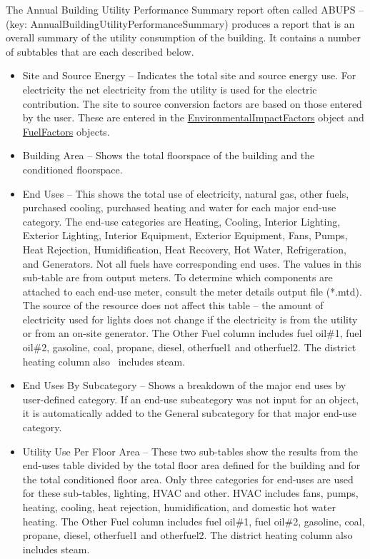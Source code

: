 The Annual Building Utility Performance Summary report often called ABUPS -- (key: AnnualBuildingUtilityPerformanceSummary) produces a report that is an overall summary of the utility consumption of the building. It contains a number of subtables that are each described below.

\begin{itemize}
\item
  Site and Source Energy -- Indicates the total site and source energy use. For electricity the net electricity from the utility is used for the electric contribution. The site to source conversion factors are based on those entered by the user. These are entered in the \hyperref[environmentalimpactfactors]{EnvironmentalImpactFactors} object and \hyperref[fuelfactors]{FuelFactors} objects.
\item
  Building Area -- Shows the total floorspace of the building and the conditioned floorspace.
\item
  End Uses -- This shows the total use of electricity, natural gas, other fuels, purchased cooling, purchased heating and water for each major end-use category. The end-use categories are Heating, Cooling, Interior Lighting, Exterior Lighting, Interior Equipment, Exterior Equipment, Fans, Pumps, Heat Rejection, Humidification, Heat Recovery, Hot Water, Refrigeration, and Generators. Not all fuels have corresponding end uses. The values in this sub-table are from output meters. To determine which components are attached to each end-use meter, consult the meter details output file (*.mtd). The source of the resource does not affect this table -- the amount of electricity used for lights does not change if the electricity is from the utility or from an on-site generator. The Other Fuel column includes fuel oil\#1, fuel oil\#2, gasoline, coal, propane, diesel, otherfuel1 and otherfuel2. The district heating column also~ includes steam.
\item
  End Uses By Subcategory -- Shows a breakdown of the major end uses by user-defined category. If an end-use subcategory was not input for an object, it is automatically added to the General subcategory for that major end-use category.
\item
  Utility Use Per Floor Area -- These two sub-tables show the results from the end-uses table divided by the total floor area defined for the building and for the total conditioned floor area. Only three categories for end-uses are used for these sub-tables, lighting, HVAC and other. HVAC includes fans, pumps, heating, cooling, heat rejection, humidification, and domestic hot water heating. The Other Fuel column includes fuel oil\#1, fuel oil\#2, gasoline, coal, propane, diesel, otherfuel1 and otherfuel2. The district heating column also~ includes steam.

\end{itemize}
